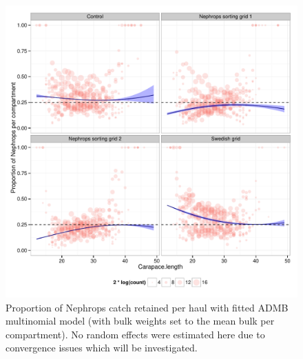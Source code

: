 \documentclass[12pt]{article}\usepackage[]{graphicx}\usepackage[]{color}
\makeatletter
\def\maxwidth{ %
  \ifdim\Gin@nat@width>\linewidth
    \linewidth
  \else
    \Gin@nat@width
  \fi
}
\newenvironment{knitrout}{}{} %
\makeatother
\begin{document}
\begin{knitrout}
\begin{figure}
\includegraphics[width=\maxwidth]{figure/unnamed-chunk-10-1} \caption[Proportion of Nephrops catch retained per haul with fitted ADMB multinomial model (with bulk weights set to the mean bulk per compartment)]{Proportion of Nephrops catch retained per haul with fitted ADMB multinomial model (with bulk weights set to the mean bulk per compartment). No random effects were estimated here due to convergence issues which will be investigated.}\label{fig:unnamed-chunk-10}
\end{figure}


\end{knitrout}
\end{document}
